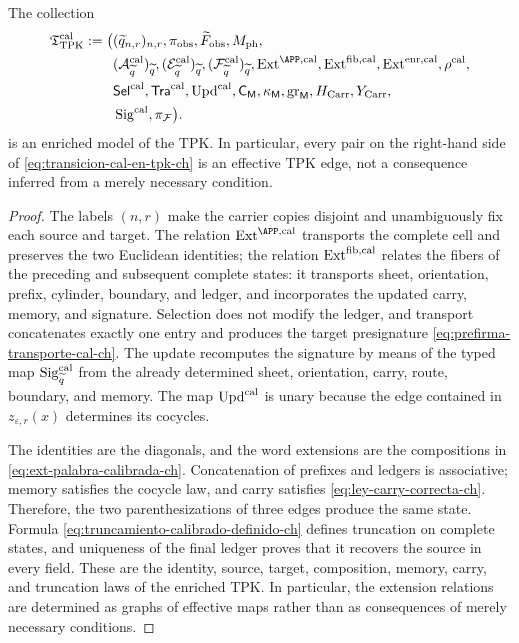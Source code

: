 \begin{proposition}
\label{prop:modelo-tpk-calibrado-ch}
The collection
\[
\begin{aligned}
 \mathfrak T_{\rm TPK}^{\rm cal}:=\bigl(
 &(\widetilde q_{n,r})_{n,r},\pi_{\rm obs},
   \widetilde F_{\rm obs},M_{\rm ph},\\
 &(\mathcal A_{\widetilde q}^{\rm cal})_{\widetilde q},
   (\mathcal E_{\widetilde q}^{\rm cal})_{\widetilde q},
   (\mathcal F_{\widetilde q}^{\rm cal})_{\widetilde q},
   \operatorname{Ext}^{\APP,\rm cal},
   \operatorname{Ext}^{\rm fib,cal},
   \operatorname{Ext}^{\rm enr,cal},\rho^{\rm cal},\\
 &\mathsf{Sel}^{\rm cal},\mathsf{Tra}^{\rm cal},
   \operatorname{Upd}^{\rm cal},\mathsf C_{\mathsf M},
   \kappa_{\mathsf M},\operatorname{gr}_{\mathsf M},
   H_{\rm Carr},Y_{\rm Carr},\\
 &\operatorname{Sig}^{\rm cal},\pi_{\mathcal F}\bigr).
\end{aligned}
\]
is an enriched model of the TPK. In particular, every pair on the right-hand
side of \eqref{eq:transicion-cal-en-tpk-ch} is an effective TPK edge, not a
consequence inferred from a merely necessary condition.
\end{proposition}

\begin{proof}
The labels \((n,r)\) make the carrier copies disjoint and unambiguously fix
each source and target. The relation \(\operatorname{Ext}^{\APP,\rm cal}\)
transports the complete cell and preserves the two Euclidean identities; the
relation \(\operatorname{Ext}^{\rm fib,cal}\) relates the fibers of the
preceding and subsequent complete states: it transports sheet, orientation,
prefix, cylinder, boundary, and ledger, and incorporates the updated carry,
memory, and signature. Selection does not modify the ledger, and transport
concatenates exactly one entry and produces the target presignature
\eqref{eq:prefirma-transporte-cal-ch}. The update recomputes the signature by
means of the typed map \(\operatorname{Sig}^{\rm cal}_{\widetilde q}\) from
the already determined sheet, orientation, carry, route, boundary, and memory.
The map \(\operatorname{Upd}^{\rm cal}\) is unary because the edge contained
in \(z_{\varepsilon,r}(x)\) determines its cocycles.

The identities are the diagonals, and the word extensions are the compositions
in \eqref{eq:ext-palabra-calibrada-ch}. Concatenation of prefixes and ledgers
is associative; memory satisfies the cocycle law, and carry satisfies
\eqref{eq:ley-carry-correcta-ch}. Therefore, the two parenthesizations of three
edges produce the same state. Formula
\eqref{eq:truncamiento-calibrado-definido-ch} defines truncation on complete
states, and uniqueness of the final ledger proves that it recovers the source
in every field. These are the identity, source, target, composition, memory,
carry, and truncation laws of the enriched TPK. In particular, the extension
relations are determined as graphs of effective maps rather than as
consequences of merely necessary conditions.
\end{proof}

